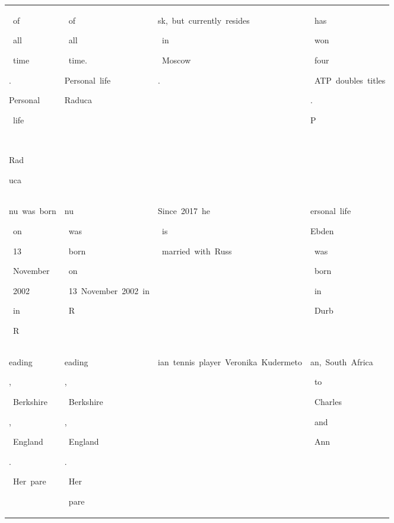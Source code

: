 \begin{table}[h]
\begin{tabular}{ l | l | l | l }
 \colorbox{cm_30!40}{\strut \ of}\colorbox{cm_32!40}{\strut \ all}\colorbox{cm_31!40}{\strut \ time}\colorbox{cm_33!40}{\strut .}\colorbox{cm_44!40}{\strut Personal}\colorbox{cm_31!40}{\strut \ life}\colorbox{cm_30!40}{\strut \ }\colorbox{cm_32!40}{\strut }\colorbox{cm_33!40}{\strut Rad}\colorbox{cm_32!40}{\strut uca} & \colorbox{cm_12!40}{\strut \ of}\colorbox{cm_0!40}{\strut \ all}\colorbox{cm_12!40}{\strut \ time.}\colorbox{cm_25!40}{\strut }\colorbox{cm_38!40}{\strut }\colorbox{cm_0!40}{\strut Personal\ life\ }\colorbox{cm_12!40}{\strut }\colorbox{cm_0!40}{\strut Raduca} & \colorbox{cm_0!40}{\strut sk,\ but\ currently\ resides}\colorbox{cm_12!40}{\strut \ in}\colorbox{cm_0!40}{\strut \ Moscow}\colorbox{cm_12!40}{\strut .} & \colorbox{cm_12!40}{\strut \ has}\colorbox{cm_0!40}{\strut \ won}\colorbox{cm_12!40}{\strut \ four}\colorbox{cm_0!40}{\strut \ ATP\ doubles\ titles}\colorbox{cm_12!40}{\strut .}\colorbox{cm_25!40}{\strut }\colorbox{cm_38!40}{\strut }\colorbox{cm_0!40}{\strut P} \\ 
 \colorbox{cm_32!40}{\strut nu\ was\ born}\colorbox{cm_25!40}{\strut \ on}\colorbox{cm_31!40}{\strut \ 13}\colorbox{cm_32!40}{\strut \ November}\colorbox{cm_30!40}{\strut \ 2002}\colorbox{cm_32!40}{\strut \ in}\colorbox{cm_34!40}{\strut \ R} & \colorbox{cm_0!40}{\strut nu}\colorbox{cm_12!40}{\strut \ was}\colorbox{cm_25!40}{\strut \ born}\colorbox{cm_38!40}{\strut \ on}\colorbox{cm_12!40}{\strut \ 13\ November\ 2002\ in}\colorbox{cm_0!40}{\strut \ R} & \colorbox{cm_25!40}{\strut }\colorbox{cm_38!40}{\strut }\colorbox{cm_0!40}{\strut Since\ 2017\ he}\colorbox{cm_12!40}{\strut \ is}\colorbox{cm_0!40}{\strut \ married\ with\ Russ} & \colorbox{cm_0!40}{\strut ersonal\ life}\colorbox{cm_12!40}{\strut }\colorbox{cm_25!40}{\strut }\colorbox{cm_0!40}{\strut Ebden}\colorbox{cm_12!40}{\strut \ was}\colorbox{cm_0!40}{\strut \ born}\colorbox{cm_12!40}{\strut \ in}\colorbox{cm_0!40}{\strut \ Durb} \\ 
 \colorbox{cm_34!40}{\strut eading}\colorbox{cm_32!40}{\strut ,}\colorbox{cm_30!40}{\strut \ Berkshire}\colorbox{cm_29!40}{\strut ,}\colorbox{cm_31!40}{\strut \ England}\colorbox{cm_30!40}{\strut .}\colorbox{cm_32!40}{\strut \ Her\ pare} & \colorbox{cm_0!40}{\strut eading}\colorbox{cm_12!40}{\strut ,}\colorbox{cm_0!40}{\strut \ Berkshire}\colorbox{cm_12!40}{\strut ,}\colorbox{cm_0!40}{\strut \ England}\colorbox{cm_12!40}{\strut .}\colorbox{cm_25!40}{\strut \ Her}\colorbox{cm_12!40}{\strut \ pare} & \colorbox{cm_0!40}{\strut ian\ tennis\ player\ Veronika\ Kudermeto} & \colorbox{cm_0!40}{\strut an,\ South\ Africa}\colorbox{cm_12!40}{\strut \ to}\colorbox{cm_0!40}{\strut \ Charles}\colorbox{cm_12!40}{\strut \ and}\colorbox{cm_0!40}{\strut \ Ann\ } \\ 

\end{tabular}
\end{table}
